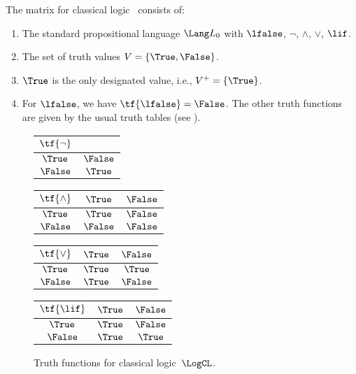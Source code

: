 \documentclass[../../../include/open-logic-section]{subfiles}
\begin{document}
\begin{ex}
The matrix for classical logic~\LogCL{} consists of:
\begin{enumerate}
  \item The standard propositional language $\Lang L_0$ with
  $\lfalse$, $\lnot$, $\land$, $\lor$, $\lif$.
  \item The set of truth values $V = \{\True, \False\}$.
  \item $\True$ is the only designated value, i.e., $V^+ = \{\True\}$.
  \item For $\lfalse$, we have $\tf{\lfalse} = \False$. The other
  truth functions are given by the usual truth tables (see
  ).
\end{enumerate}
\begin{figure}
  \begin{center}
      \begin{tabular}{c|c} 
        $\tf{\lnot}$ & \\ 
        \hline  
        $\True$ & $\False$ \\ 
        $\False$ & $\True$ 
      \end{tabular}
      \quad
      \begin{tabular}{c|cc} 
        $\tf{\land}$ & $\True$ & $\False$ \\ 
        \hline 
        $\True$ & $\True$ & $\False$ \\ 
        $\False$ & $\False$ & $\False$ 
      \end{tabular}
      \quad
      \begin{tabular}{c|cc} 
        $\tf{\lor}$ & $\True$ & $\False$ \\ 
        \hline 
        $\True$ & $\True$ & $\True$ \\ 
        $\False$ & $\True$ & $\False$ 
      \end{tabular}
      \quad
      \begin{tabular}{c|cc} 
        $\tf{\lif}$ & $\True$ & $\False$ \\ 
        \hline 
        $\True$ & $\True$ & $\False$ \\ 
        $\False$ & $\True$ & $\True$ 
      \end{tabular}
    \end{center} 
    \caption{Truth functions for classical logic~$\LogCL$.}
  \end{figure}
  \end{ex}
\end{document}

